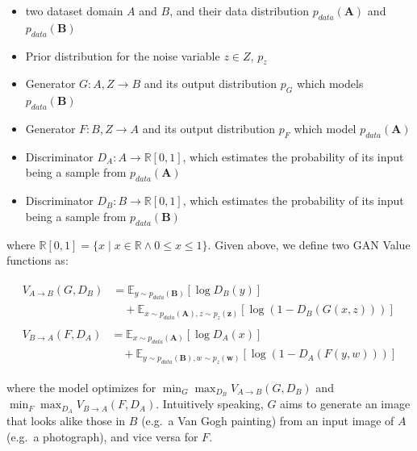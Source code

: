 \documentclass[]{article}
\providecommand{\tightlist}{%
  \setlength{\itemsep}{0pt}\setlength{\parskip}{0pt}}
\begin{document}
\begin{itemize}
\tightlist
\item
  two dataset domain \(A\) and \(B\), and their data distribution
  \(p_{data}(\mathbf{A})\) and \(p_{data}(\mathbf{B})\)
\item
  Prior distribution for the noise variable \(z \in Z\), \(p_z\)
\item
  Generator \(G: A, Z \rightarrow B\) and its output distribution
  \(p_G\) which models \(p_{data}(\mathbf{B})\)
\item
  Generator \(F: B, Z \rightarrow A\) and its output distribution
  \(p_F\) which model \(p_{data}(\mathbf{A})\)
\item
  Discriminator \(D_{A}: A \rightarrow \mathbb{R}[0, 1]\), which
  estimates the probability of its input being a sample from
  \(p_{data}(\mathbf{A})\)
\item
  Discriminator \(D_{B}: B \rightarrow \mathbb{R}[0, 1]\), which
  estimates the probability of its input being a sample from
  \(p_{data}(\mathbf{B})\)
\end{itemize}

where
\(\mathbb{R}[0, 1] = \{x \mid x \in \mathbb{R} \land 0 \leq x \leq 1 \}\).
Given above, we define two GAN Value functions as:

\begin{align}
    \begin{split}
        V_{A \rightarrow B}(G, D_B) &= \mathbb{E}_{y \sim p_{data}(\mathbf{B})}[ \log D_B(y)]  \\
        &\quad + \mathbb{E}_{x \sim p_{data}(\mathbf{A}), z \sim p_{z}(\mathbf{z})} [\log (1 - D_B(G(x, z)))] \label{eq:cyclegan_1}
    \end{split} \\
    \begin{split}
        V_{B \rightarrow A}(F, D_A) &= \mathbb{E}_{x \sim p_{data}(\mathbf{A})}[ \log D_A(x)]  \\
        &\quad + \mathbb{E}_{y \sim p_{data}(\mathbf{B}), w \sim p_{z}(\mathbf{w})} [\log (1 - D_A(F(y, w)))] \label{eq:cyclegan_2}
    \end{split} 
\end{align}

where the model optimizes for
\(\displaystyle \min_G \max_{D_B} V_{A \rightarrow B}(G, D_B)\) and
\(\displaystyle \min_F \max_{D_A} V_{B \rightarrow A}(F, D_A)\).
Intuitively speaking, \(G\) aims to generate an image that looks alike
those in \(B\) (e.g.~a Van Gogh painting) from an input image of \(A\)
(e.g.~a photograph), and vice versa for \(F\).
\end{document}
